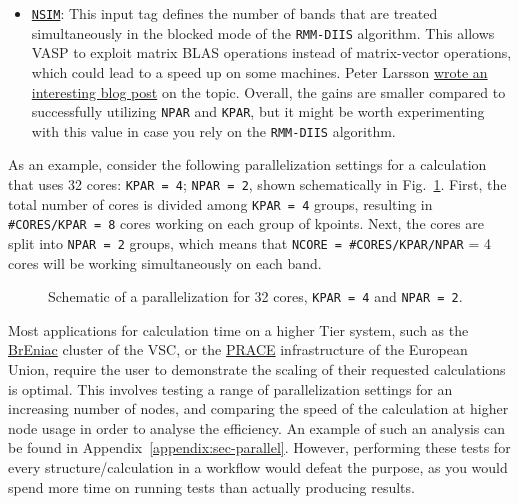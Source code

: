 \begin{refsection}
\begin{itemize}
\item \href{https://cms.mpi.univie.ac.at/wiki/index.php/NSIM}{\texttt{NSIM}}: 
This input tag defines the number of bands that are treated simultaneously in 
the blocked mode of the \texttt{RMM-DIIS} algorithm. This allows VASP 
to exploit matrix BLAS operations instead of matrix-vector operations, which 
could lead to a speed up on some machines. Peter Larsson 
\href{https://www.nsc.liu.se/~pla/blog/2012/02/22/nparnsim/}{wrote an 
interesting blog post} on the topic. Overall, the gains are smaller compared to 
successfully utilizing \verb|NPAR| and \verb|KPAR|, but it might be worth 
experimenting with this value in case you rely on the \texttt{RMM-DIIS} 
algorithm. 
 
\end{itemize} 
 
As an example, consider the following parallelization settings for a 
calculation that uses 32 cores: \texttt{KPAR = 4}; \texttt{NPAR = 2}, shown 
schematically in Fig.~\ref{automation:fig-parallel}. First, the total number 
of cores is divided among \texttt{KPAR = 4} groups, resulting in 
\texttt{\#CORES/KPAR = 8} cores working on each group of kpoints. Next, the 
cores are split into \texttt{NPAR = 2} groups, which means that \texttt{NCORE 
= \#CORES/KPAR/NPAR} = 4 cores will be working simultaneously on each band. 
 
\begin{figure}[hb] 
\centering 
 
\caption{Schematic of a parallelization for 32 cores, \texttt{KPAR = 4}  and 
\texttt{NPAR = 2}.} 
\label{automation:fig-parallel} 
\end{figure} 
 
Most applications for calculation time on a higher Tier system, such as the 
\href{https://www.vscentrum.be/tier1}{BrEniac} cluster of the VSC, or the 
\href{http://www.prace-ri.eu/}{PRACE} infrastructure of the European Union, 
require the user to demonstrate the scaling of their requested calculations is 
optimal. This involves testing a range of parallelization settings for an 
increasing number of nodes, and comparing the speed of the calculation at 
higher node usage in order to analyse the efficiency. An example of such an 
analysis can be found in Appendix~\ref{appendix:sec-parallel}. However, 
performing these tests for every structure/calculation in a workflow would 
defeat the purpose, as you would spend more time on running tests than 
actually producing results.  
 

\end{refsection}
